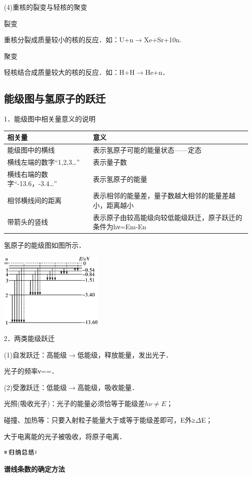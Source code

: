 (4)重核的裂变与轻核的聚变

裂变

重核分裂成质量较小的核的反应．如：U+n$\rightarrow$Xe+Sr+10n.　

聚变

轻核结合成质量较大的核的反应．如：H+H$\rightarrow$He+n．
\newpage
\subsection{能级图与氢原子的跃迁}

1．能级图中相关量意义的说明

\begin{longtable}[]{@{}m{5cm}m{7cm}@{}}
\toprule
相关量 & 意义\tabularnewline
\midrule
\endhead
能级图中的横线 & 表示氢原子可能的能量状态------定态\tabularnewline
横线左端的数字``1,2,3\ldots'' & 表示量子数\tabularnewline
横线右端的数字``-13.6，-3.4\ldots'' & 表示氢原子的能量\tabularnewline
相邻横线间的距离 &
表示相邻的能量差，量子数越大相邻的能量差越小，距离越小\tabularnewline
带箭头的竖线 &
表示原子由较高能级向较低能级跃迁，原子跃迁的条件为hν=Em-En\tabularnewline
\bottomrule
\end{longtable}

氢原子的能级图如图所示．

\begin{center}\includegraphics[width=2.00972in,height=1.45278in]{media/image478.png}\end{center}

2．两类能级跃迁

(1)自发跃迁：高能级$\rightarrow$低能级，释放能量，发出光子．

光子的频率ν==．

(2)受激跃迁：低能级$\rightarrow$高能级，吸收能量．

光照(吸收光子)：光子的能量必须恰等于能级差$hν\neq E$；

碰撞、加热等：只要入射粒子能量大于或等于能级差即可，E外≥$\Delta$E；

大于电离能的光子被吸收，将原子电离．

\begin{center}\includegraphics[width=0.70764in,height=0.12292in]{media/image13.png}\end{center}
\begin{center}
    \textbf{谱线条数的确定方法}
\end{center}

